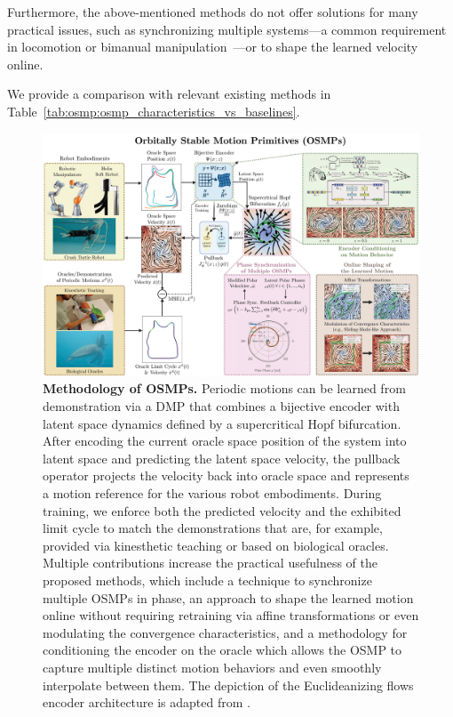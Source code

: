 Furthermore, the above-mentioned methods do not offer solutions for many practical issues, such as synchronizing multiple systems—a common requirement in locomotion or bimanual manipulation~\citep{gams2015accelerating}—or to shape the learned velocity online.

We provide a comparison with relevant existing methods in Table~\ref{tab:osmp:osmp_characteristics_vs_baselines}.

\begin{figure}[h!]
    \centering
    \includegraphics[width=1.0\linewidth]{osmp/figures/methodology_overview/osmp_methodology_overview_v3_compressed.pdf}
    \caption{
    \textbf{Methodology of \glspl{OSMP}.}
    Periodic motions can be learned from demonstration via a \gls{DMP} that combines a bijective encoder with latent space dynamics defined by a supercritical Hopf bifurcation. After encoding the current oracle space position of the system into latent space and predicting the latent space velocity, the pullback operator projects the velocity back into oracle space and represents a motion reference for the various robot embodiments. During training, we enforce both the predicted velocity and the exhibited limit cycle to match the demonstrations that are, for example, provided via kinesthetic teaching or based on biological oracles.
    Multiple contributions increase the practical usefulness of the proposed methods, which include a technique to synchronize multiple \glspl{OSMP} in phase, an approach to shape the learned motion online without requiring retraining via affine transformations or even modulating the convergence characteristics, and a methodology for conditioning the encoder on the oracle which allows the \gls{OSMP} to capture multiple distinct motion behaviors and even smoothly interpolate between them.
    The depiction of the Euclideanizing flows encoder architecture is adapted from \citet{rana2020euclideanizing}.
    }
    \label{fig:osmp:methodology_overview}
\end{figure}

